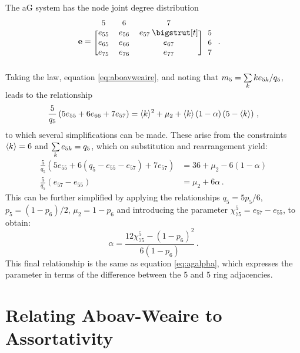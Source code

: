 The aG system has the node joint degree distribution
\begin{align}
	\mathbf{e} &= \begin{blockarray}{*{3}{c} l}
	\begin{block}{*{3}{>{$\footnotesize}c<{$}} l}
	5 & 6 & 7 \\
	\end{block}
	\begin{block}{[*{3}{c}]>{$\footnotesize}l<{$}}
	e_{55} & e_{56} & e_{57} \: \bigstrut[t]& 5\\
	e_{65} & e_{66} & e_{67} & 6 \\
	e_{75} & e_{76} & e_{77} & 7\\
	\end{block}
	\end{blockarray} \,.
\end{align}
Taking the \aw{} law, equation \eqref{eq:aboavweaire}, and noting that $m_5=\sum\limits_k ke_{5k}/q_5$, leads to the relationship
\begin{equation}
	\frac{5}{q_5}\left(5e_{55}+6e_{66}+7e_{57}\right) = \langle k \rangle^2+\mu_2+\langle k \rangle\left(1-\alpha\right)\left(5-\langle k \rangle\right)\,,
\end{equation}
to which several simplifications can be made.
These arise from the constraints $\langle k \rangle=6$ and $\sum\limits_k e_{5k}=q_5$, which on substitution and rearrangement yield:
\begin{align}
	\frac{5}{q_5}\left(5e_{55}+6\left(q_5-e_{55}-e_{57}\right)+7e_{57}\right) &= 36+\mu_2-6\left(1-\alpha\right) \nonumber \\
	\frac{5}{q_5}\left(e_{57}-e_{55}\right)&=\mu_2+6\alpha\,.
\end{align}
This can be further simplified by applying the relationships $q_5=5p_5/6$, $p_5=\left(1-p_6\right)/2$, $\mu_2=1-p_6$ and introducing the parameter $\chi_{75}^{5}=e_{57}-e_{55}$, to obtain:
\begin{equation}
	\alpha=\frac{12\chi_{75}^5-\left(1-p_6\right)^2}{6\left(1-p_6\right)}\,.
\end{equation}
This final relationship is the same as equation \eqref{eq:agalpha}, which expresses the \aw{} parameter in terms of the difference between the 5 and 5 ring adjacencies.

\clearpage
\section{Relating Aboav\--Weaire to Assortativity}
\label{app:derivalphaassort}

